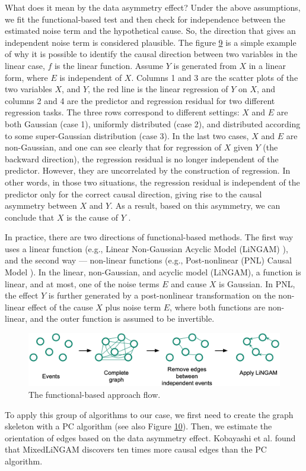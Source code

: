 What does it mean by the data asymmetry effect? Under the above assumptions, we fit the functional-based test and then check for independence between the estimated noise term and the hypothetical cause. So, the direction that gives an independent noise term is considered plausible. The figure \hyperref[fig:fb-example]{9} is a simple example of why it is possible to identify the causal direction between two variables in the linear case, $f$ is the linear function. Assume $Y$ is generated from $X$ in a linear form, where $E$ is independent of $X$. Columns 1 and 3 are the scatter plots of the two variables $X$, and $Y$, the red line is the linear regression of $Y$ on $X$, and columns 2 and 4 are the predictor and regression residual for two different regression tasks. The three rows correspond to different settings: $X$ and $E$ are both Gaussian (case 1), uniformly distributed (case 2), and distributed according to some super-Gaussian distribution (case 3). In the last two cases, $X$ and $E$ are non-Gaussian, and one can see clearly that for regression of $X$ given $Y$ (the backward direction), the regression residual is no longer independent of the predictor. However, they are uncorrelated by the construction of regression. In other words, in those two situations, the regression residual is independent of the predictor only for the correct causal direction, giving rise to the causal asymmetry between $X$ and $Y$. As a result, based on this asymmetry, we can conclude that $X$ is the cause of $Y$ \cite{glymour2019review,goudet2018learning}.\newline

In practice, there are two directions of functional-based methods. The first way uses a linear function (e.g., Linear Non-Gaussian Acyclic Model (LiNGAM) \cite{shimizu2006linear}), and the second way — non-linear functions (e.g., Post-nonlinear (PNL) Causal Model \cite{zhang2012identifiability}). In the linear, non-Gaussian, and acyclic model (LiNGAM), a function is linear, and at most, one of the noise terms $E$ and cause $X$ is Gaussian. In PNL, the effect $Y$ is further generated by a post-nonlinear transformation on the non-linear effect of the cause $X$ plus noise term $E$, where both functions are non-linear, and the outer function is assumed to be invertible.
\begin{figure}[H]
\centering
    \label{fig:fb-flow}
    \includegraphics[width=\textwidth]{figures/fb_flow.png}
    \caption{The functional-based approach flow.}
\end{figure}
To apply this group of algorithms to our case, we first need to create the graph skeleton with a PC algorithm (see also Figure \hyperref[fig:fb-flow]{10}). Then, we estimate the orientation of edges based on the data asymmetry effect. Kobayashi et al. \cite{jarry2021quantitative} found that MixedLiNGAM discovers ten times more causal edges than the PC algorithm. 
